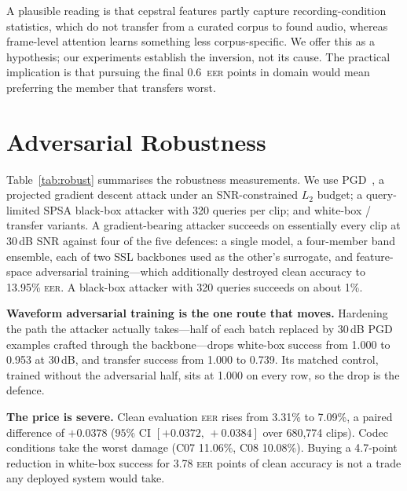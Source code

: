 \documentclass{llncs}
\newcommand{\eer}{\textsc{eer}}
\begin{document}
A plausible reading is that cepstral features partly capture recording-condition
statistics, which do not transfer from a curated corpus to found audio, whereas
frame-level attention learns something less corpus-specific.  We offer this as a
hypothesis; our experiments establish the inversion, not its cause.  The practical
implication is that pursuing the final 0.6~\eer{} points in domain would mean
preferring the member that transfers worst.

\section{Adversarial Robustness}
\label{sec:robust}

\begin{table}[t]
\centering
\small
\caption{Attack success at a 0.1\% false-alarm operating point, 20-step PGD
under an SNR-constrained $L_2$ budget~\cite{madry2018}.  Realised SNR is
reported, not assumed.  Generated from attack logs; the table cannot drift from
measurements.  Four routes are closed outright; waveform adversarial training is
the only one that moves white-box success off 1.000.}
\label{tab:robust}

\end{table}

Table~\ref{tab:robust} summarises the robustness measurements.
We use PGD~\cite{madry2018}, a projected gradient descent attack under an
SNR-constrained $L_2$ budget; a query-limited SPSA black-box attacker with 320
queries per clip; and white-box / transfer variants.  A gradient-bearing attacker
succeeds on essentially every clip at 30\,dB SNR against four of the five
defences: a single model, a four-member band ensemble, each of two SSL backbones
used as the other's surrogate, and feature-space adversarial
training---which additionally destroyed clean accuracy to 13.95\% \eer{}.
A black-box attacker with 320 queries succeeds on about 1\%.

\textbf{Waveform adversarial training is the one route that moves.}
Hardening the path the attacker actually takes---half of each batch replaced by
30\,dB PGD examples crafted through the backbone---drops white-box success from
1.000 to 0.953 at 30\,dB, and transfer success from 1.000 to 0.739.  Its matched
control, trained without the adversarial half, sits at 1.000 on every row, so the
drop is the defence.

\textbf{The price is severe.}  Clean evaluation \eer{} rises from 3.31\% to
7.09\%, a paired difference of $+0.0378$ ($95\%$ CI $[+0.0372,\,+0.0384]$ over
680{,}774 clips).  Codec conditions take the worst damage (C07 11.06\%, C08
10.08\%).  Buying a 4.7-point reduction in white-box success for 3.78 \eer{}
points of clean accuracy is not a trade any deployed system would take.
\end{document}
